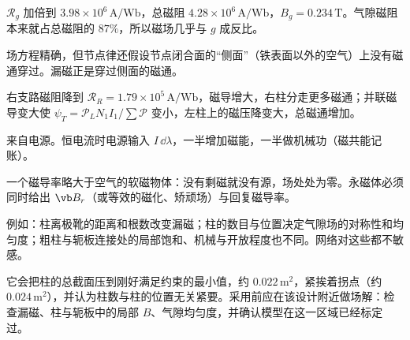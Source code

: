 \begin{answers}
\item $\mathcal R_g$ 加倍到 $3.98\times10^6\,\mathrm{A/Wb}$，总磁阻 $4.28\times10^6\,\mathrm{A/Wb}$，$B_g=0.234\,\mathrm T$。气隙磁阻本来就占总磁阻的 $87\%$，所以磁场几乎与 $g$ 成反比。
\item 场方程精确，但节点律还假设节点闭合面的“侧面”（铁表面以外的空气）上没有磁通穿过。漏磁正是穿过侧面的磁通。
\item 右支路磁阻降到 $\mathcal R_R=1.79\times10^5\,\mathrm{A/Wb}$，磁导增大，右柱分走更多磁通；并联磁导变大使 $\psi_T=\mathcal P_LN_1I_1/\sum\mathcal P$ 变小，左柱上的磁压降变大，总磁通增加。
\item 来自电源。恒电流时电源输入 $I\,\dd\lambda$，一半增加磁能，一半做机械功（磁共能记账）。
\item 一个磁导率略大于空气的软磁物体：没有剩磁就没有源，场处处为零。永磁体必须同时给出 $\vb B_r$（或等效的磁化、矫顽场）与回复磁导率。
\item 例如：柱离极靴的距离和根数改变漏磁；柱的数目与位置决定气隙场的对称性和均匀度；粗柱与轭板连接处的局部饱和、机械与开放程度也不同。网络对这些都不敏感。
\item 它会把柱的总截面压到刚好满足约束的最小值，约 $0.022\,\mathrm{m^2}$，紧挨着拐点（约 $0.024\,\mathrm{m^2}$），并认为柱数与柱的位置无关紧要。采用前应在该设计附近做场解：检查漏磁、柱与轭板中的局部 $B$、气隙均匀度，并确认模型在这一区域已经标定过。
\end{answers}

